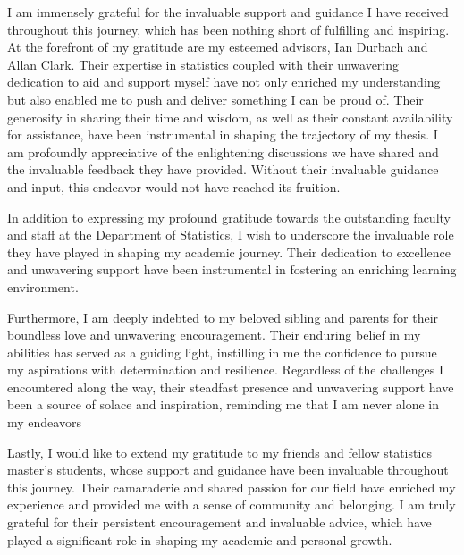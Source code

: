 \documentclass[
12pt, %
english, %
singlespacing, %
parskip, %
headsepline, %
openany %
]{MastersDoctoralThesis} %
\numberwithin{theorem}{section}
\numberwithin{remark}{section}
\numberwithin{assumption}{section}
\begin{document}
\begin{titlepage}
\begin{center}
\vfill
\end{center}
\end{titlepage}


\begin{acknowledgements}
\addchaptertocentry{\acknowledgementname} 
\vspace{1.5cm}

I am immensely grateful for the invaluable support and guidance I have received throughout this journey, which has been nothing short of fulfilling and inspiring. At the forefront of my gratitude are my esteemed advisors, Ian Durbach and Allan Clark. Their  expertise in statistics coupled with their unwavering dedication to aid and support myself have not only enriched my understanding but also enabled me to push and deliver something I can be proud of. Their generosity in sharing their time and wisdom, as well as their constant availability for assistance, have been instrumental in shaping the trajectory of my thesis. I am profoundly appreciative of the enlightening discussions we have shared and the invaluable feedback they have provided. Without their invaluable guidance and input, this endeavor would not have reached its fruition.

\vspace{0.3cm}

In addition to expressing my profound gratitude towards the outstanding faculty and staff at the Department of Statistics, I wish to underscore the invaluable role they have played in shaping my academic journey. Their dedication to excellence and unwavering support have been instrumental in fostering an enriching learning environment.

Furthermore, I am deeply indebted to my beloved sibling and parents for their boundless love and unwavering encouragement. Their enduring belief in my abilities has served as a guiding light, instilling in me the confidence to pursue my aspirations with determination and resilience. Regardless of the challenges I encountered along the way, their steadfast presence and unwavering support have been a source of solace and inspiration, reminding me that I am never alone in my endeavors

\vspace{0.3cm}

Lastly, I would like to extend my gratitude to my friends and fellow statistics master's students, whose support and guidance have been invaluable throughout this journey. Their camaraderie and shared passion for our field have enriched my experience and provided me with a sense of community and belonging. I am truly grateful for their persistent encouragement and invaluable advice, which have played a significant role in shaping my academic and personal growth.







\end{acknowledgements}
\end{document}
